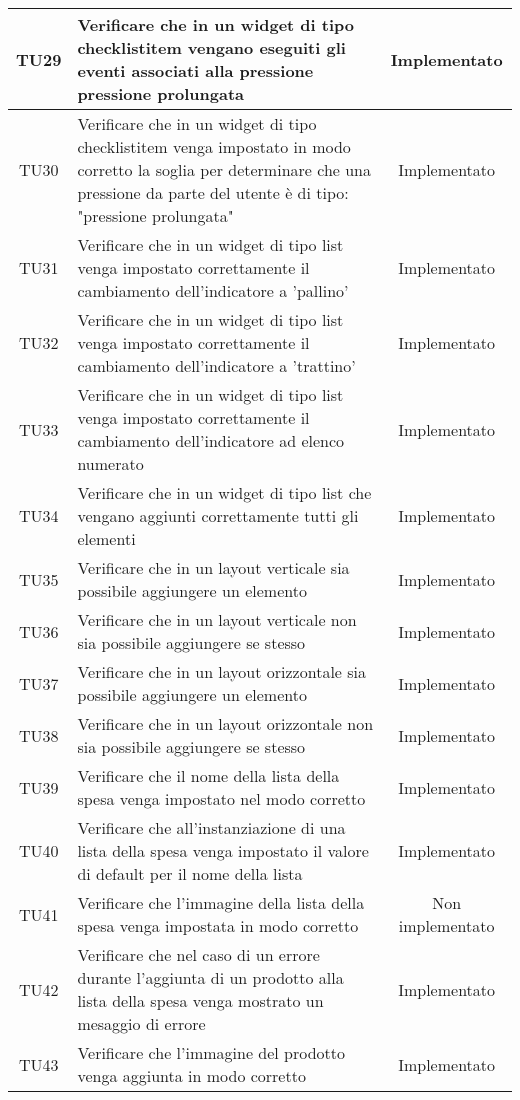 \begin{center}
\begin{longtable}{|c|>{\centering}m{10cm}|c|}
		TU29 & Verificare che in un widget di tipo checklistitem vengano eseguiti gli eventi associati alla pressione pressione prolungata & Implementato \\ \hline
		TU30 & Verificare che in un widget di tipo checklistitem venga impostato in modo corretto la soglia per determinare che una pressione da parte del utente è di tipo: "pressione prolungata" & Implementato \\ \hline
		TU31 & Verificare che in un widget di tipo list venga impostato correttamente il cambiamento dell'indicatore a 'pallino' & Implementato \\ \hline
		TU32 & Verificare che in un widget di tipo list venga impostato correttamente il cambiamento dell'indicatore a 'trattino' & Implementato \\ \hline
		TU33 & Verificare che in un widget di tipo list venga impostato correttamente il cambiamento dell'indicatore ad elenco numerato & Implementato \\ \hline
		TU34 & Verificare che in un widget di tipo list che vengano aggiunti correttamente tutti gli elementi & Implementato \\ \hline
		TU35 & Verificare che in un layout verticale sia possibile aggiungere un elemento & Implementato \\ \hline
		TU36 & Verificare che in un layout verticale non sia possibile aggiungere se stesso & Implementato \\ \hline
		TU37 & Verificare che in un layout orizzontale sia possibile aggiungere un elemento & Implementato \\ \hline
		TU38 & Verificare che in un layout orizzontale non sia possibile aggiungere se stesso & Implementato \\ \hline
		TU39 & Verificare che il nome della lista della spesa venga impostato nel modo corretto & Implementato \\ \hline
		TU40 & Verificare che all'instanziazione di una lista della spesa venga impostato il valore di default per il nome della lista & Implementato \\ \hline
		TU41 & Verificare che l'immagine della lista della spesa venga impostata in modo corretto & Non implementato \\ \hline
		TU42 & Verificare che nel caso di un errore durante l'aggiunta di un prodotto alla lista della spesa venga mostrato un mesaggio di errore & Implementato \\ \hline
		TU43 & Verificare che l'immagine del prodotto venga aggiunta in modo corretto & Implementato \\ \hline

\end{longtable}
\end{center}
